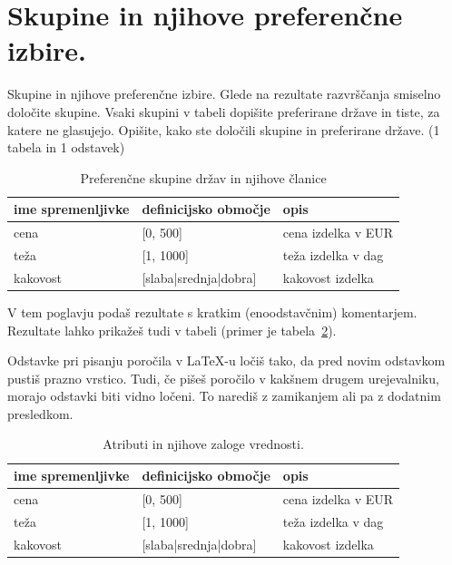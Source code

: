 \documentclass[a4paper,11pt]{article}
\begin{document}
\section{Skupine in njihove preferenčne izbire.}
Skupine in njihove preferenčne izbire. Glede na rezultate razvrščanja smiselno določite skupine. Vsaki skupini v tabeli dopišite preferirane države in tiste, za katere ne glasujejo. Opišite, kako ste določili skupine in preferirane države. (1 tabela in 1 odstavek)

\begin{table}[htbp]
\caption{Preferenčne skupine držav in njihove članice}
\label{tab1}
\begin{center}
\begin{tabular}{llp{3cm}}
\hline
ime spremenljivke & definicijsko območje & opis \\
\hline
cena & [0, 500] & cena izdelka v EUR\\
teža & [1, 1000] & teža izdelka v dag \\
kakovost & [slaba|srednja|dobra] & kakovost izdelka \\
\hline
\end{tabular}
\end{center}
\end{table}




V tem poglavju podaš rezultate s kratkim (enoodstavčnim)
komentarjem. Rezultate lahko prikažeš tudi v tabeli (primer je
tabela~\ref{tab1}).

Odstavke pri pisanju poročila v LaTeX-u ločiš tako, da pred novim
odstavkom pustiš prazno vrstico. Tudi, če pišeš poročilo v kakšnem
drugem urejevalniku, morajo odstavki biti vidno ločeni. To narediš z
zamikanjem ali pa z dodatnim presledkom.

\begin{table}[htbp]
\caption{Atributi in njihove zaloge vrednosti.}
\label{tab1}
\begin{center}
\begin{tabular}{llp{3cm}}
\hline
ime spremenljivke & definicijsko območje & opis \\
\hline
cena & [0, 500] & cena izdelka v EUR\\
teža & [1, 1000] & teža izdelka v dag \\
kakovost & [slaba|srednja|dobra] & kakovost izdelka \\
\hline
\end{tabular}
\end{center}
\end{table}
\end{document}
